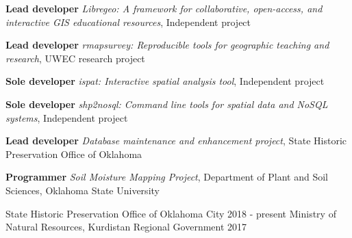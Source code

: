 


\begin{softwareproject}
  \software
  {\textbf{Lead developer}}
  {\textit{Libregeo: A framework for collaborative, open-access, and interactive
    GIS educational resources},
    Independent project}
  {\href{https://libregeo.com}{\color{awesome}{https://libregeo.com}}}

  \software
  {\textbf{Lead developer}}
  {\textit{rmapsurvey: Reproducible tools for geographic teaching and research},
    UWEC research project}
  {\href{https://gitlab.com/mhaffner/rmapsurvey}{\color{awesome}{https://gitlab.com/mhaffner/rmapsurvey}}}

  \software
  {\textbf{Sole developer}}
  {\textit{ispat: Interactive spatial analysis tool}, Independent project}
  {\href{https://geohaff.com/ispat}{\color{awesome}{https://geohaff.com/ispat}}}

  \software
  {\textbf{Sole developer}}
  {\textit{shp2nosql: Command line tools for spatial data and
      NoSQL systems}, Independent project}
  {\href{https://github.com/mhaffner/shp2nosql}{\color{awesome}{https://github.com/mhaffner/shp2nosql}}}

  \software
  {\textbf{Lead developer}}
  {\textit{Database maintenance and enhancement project}, State
    Historic Preservation Office of Oklahoma}
  {\href{http://nr2_shpo.okstate.edu}{\color{awesome}{http://nr2\_shpo.okstate.edu}}}

  \software
  {\textbf{Programmer}}
  {\textit{Soil Moisture Mapping Project}, Department of Plant and Soil
    Sciences, Oklahoma State University}
  {\href{http://soilmoisture.okstate.edu}{\color{awesome}{http://soilmoisture.okstate.edu}}}

\end{softwareproject}


\begin{cvmemberships}
  \cvmembership
    {\hspace{-3 em}}
    {State Historic Preservation Office of Oklahoma City}
    {2018 - present}
    {} %
  \cvmembership
    {\hspace{-3 em}}
    {Ministry of Natural Resources, Kurdistan Regional Government}
    {\hspace{-2 em} 2017}
    {} %
\end{cvmemberships}